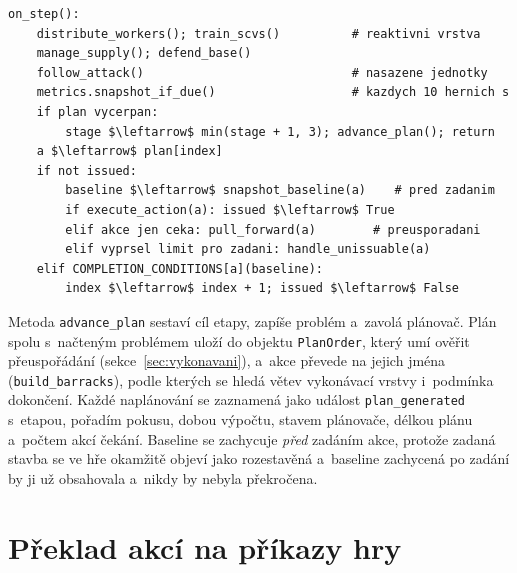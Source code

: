 \begin{lstlisting}[caption={Řídicí smyčka agenta (zjednodušeno).},label=lst:onstep,float,basicstyle=\ttfamily\small,mathescape=true]
on_step():
    distribute_workers(); train_scvs()          # reaktivni vrstva
    manage_supply(); defend_base()
    follow_attack()                             # nasazene jednotky
    metrics.snapshot_if_due()                   # kazdych 10 hernich s
    if plan vycerpan:
        stage $\leftarrow$ min(stage + 1, 3); advance_plan(); return
    a $\leftarrow$ plan[index]
    if not issued:
        baseline $\leftarrow$ snapshot_baseline(a)    # pred zadanim
        if execute_action(a): issued $\leftarrow$ True
        elif akce jen ceka: pull_forward(a)        # preusporadani
        elif vyprsel limit pro zadani: handle_unissuable(a)
    elif COMPLETION_CONDITIONS[a](baseline):
        index $\leftarrow$ index + 1; issued $\leftarrow$ False
\end{lstlisting}

Metoda \texttt{advance\_plan} sestaví cíl etapy, zapíše problém a~zavolá plánovač. Plán spolu s~načteným problémem uloží do objektu \texttt{PlanOrder}, který umí ověřit přeuspořádání (sekce~\ref{sec:vykonavani}), a~akce převede na jejich jména (\texttt{build\_barracks}), podle kterých se hledá větev vykonávací vrstvy i~podmínka dokončení. Každé naplánování se zaznamená jako událost \texttt{plan\_generated} s~etapou, pořadím pokusu, dobou výpočtu, stavem plánovače, délkou plánu a~počtem akcí čekání. Baseline se zachycuje \emph{před} zadáním akce, protože zadaná stavba se ve hře okamžitě objeví jako rozestavěná a~baseline zachycená po zadání by ji už obsahovala a~nikdy by nebyla překročena.

\section{Překlad akcí na příkazy hry}
\label{sec:preklad}

